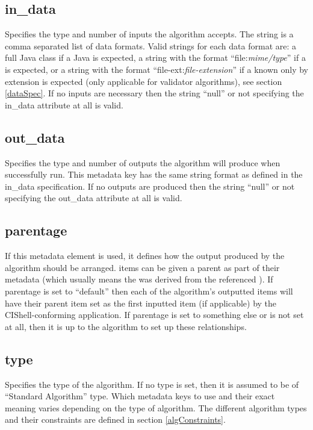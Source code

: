 \subsection*{in\_data}
Specifies the type and number of  inputs the
algorithm accepts. The string is a comma separated list of data formats. Valid strings
for each data format are: a full Java class if a Java  is
expected, a string with the format ``file:\textit{mime/type}'' if a
 is expected, or a string with the format
``file-ext:\textit{file-extension}'' if a  known only by
extension is expected (only applicable for validator algorithms), see section
\ref{dataSpec}. If no  inputs are necessary then the string
``null'' or not specifying the in\_data attribute at all is valid.

\subsection*{out\_data}
Specifies the type and number of  outputs
the algorithm will produce when successfully run. This metadata key has the same string format
as defined in the in\_data specification. If no  outputs are
produced then the string ``null'' or not specifying the out\_data attribute at
all is valid.

\subsection*{parentage}
If this metadata element is used, it defines how the output 
produced by the algorithm should be arranged.  items can be given a parent as
part of their metadata (which usually means the  was derived from
the referenced ). If parentage is set to ``default'' then each of the
algorithm's outputted  items will have their parent  item
set as the first inputted  item (if applicable) by the
CIShell-conforming application. If parentage is set to something else or is not
set at all, then it is up to the algorithm to set up these relationships.

\subsection*{type}
Specifies the type of the algorithm. If no type is set, then
it is assumed to be of ``Standard Algorithm'' type. Which metadata keys to use and
their exact meaning varies depending on the type of algorithm. The different
algorithm types and their constraints are defined in section
\ref{algConstraints}.

